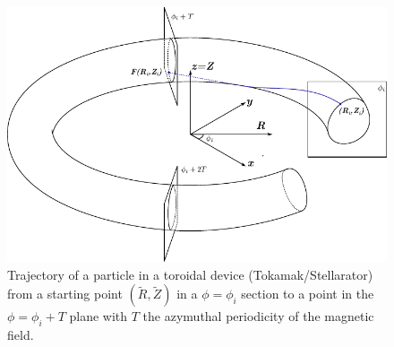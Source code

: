 \begin{figure}[H]
    \centering
    \includegraphics{images/theory/poincare-torus.pdf}
    \caption{Trajectory of a particle in a toroidal device (Tokamak/Stellarator) from a starting point $(\tilde{R}, \tilde{Z})$ in a $\phi = \phi_i$ section to a point in the $\phi = \phi_i + T$ plane with $T$ the azymuthal periodicity of the magnetic field.}
    \label{fig:th-poincare-map}
\end{figure}

